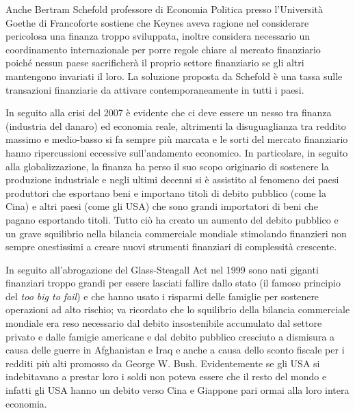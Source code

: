 \documentclass[11pt]{article}
\begin{document}
Anche Bertram Schefold professore di  Economia Politica presso l'Universit\`a Goethe di Francoforte
sostiene che Keynes aveva ragione nel considerare  pericolosa una finanza troppo sviluppata, inoltre 
considera necessario un coordinamento internazionale per porre regole chiare al mercato finanziario
poich\'e nessun paese sacrificher\`a il proprio settore finanziario
se gli altri mantengono invariati il loro. La soluzione proposta da Schefold \`e una tassa sulle transazioni
finanziarie da attivare contemporaneamente in tutti i paesi.

In seguito alla crisi del 2007 \`e evidente che ci deve essere un nesso tra finanza (industria del danaro) 
ed economia reale, altrimenti  la disuguaglianza tra reddito massimo e medio-basso 
si fa sempre pi\`u marcata e le sorti del mercato finanziario hanno ripercussioni
eccessive sull'andamento economico.
In particolare, in seguito alla globalizzazione, la finanza ha perso il suo scopo originario di
sostenere la produzione industriale e negli ultimi decenni si \`e assistito al fenomeno dei paesi produttori
che esportano beni e importano titoli di debito pubblico (come la Cina) e altri paesi (come 
gli USA) che sono grandi importatori di beni che pagano esportando titoli.
Tutto ci\`o ha creato un aumento del debito pubblico e un grave squilibrio nella bilancia commerciale mondiale
stimolando finanzieri non sempre onestissimi a creare nuovi strumenti finanziari di complessit\`a crescente.

In seguito all'abrogazione del Glass-Steagall Act nel 1999
sono nati giganti finanziari troppo grandi per essere 
lasciati fallire dallo stato (il famoso principio del \emph{too big to fail})
e che hanno usato i risparmi delle famiglie per sostenere operazioni ad alto rischio;
va ricordato che lo squilibrio della bilancia commerciale mondiale era reso necessario dal debito insostenibile accumulato
dal settore privato e dalle famigie americane e dal debito 
pubblico cresciuto a dismisura a causa delle guerre in Afghanistan e Iraq e anche a causa dello sconto 
fiscale per i redditi pi\`u alti promosso 
da George W. Bush.
Evidentemente se gli USA si indebitavano a prestar loro i soldi non poteva essere che il
resto del mondo e 
infatti gli USA hanno un debito verso Cina e Giappone pari ormai alla loro
intera economia.
\end{document}
